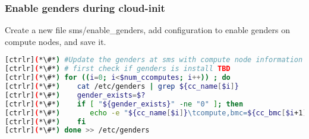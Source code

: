  \subsubsection{Enable genders during cloud-init}
	
	Create a new file sms/enable\_genders, add configuration to enable genders on compute nodes, and save it. 

 
 
 \begin{lstlisting}[language=bash,keywords={}]
[ctrlr](*\#*) #Update the genders at sms with compute node information
[ctrlr](*\#*) # first check if genders is install TBD
[ctrlr](*\#*) for ((i=0; i<$num_ccomputes; i++)) ; do
[ctrlr](*\#*)    cat /etc/genders | grep ${cc_name[$i]}
[ctrlr](*\#*)    gender_exists=$?
[ctrlr](*\#*)    if [ "${gender_exists}" -ne "0" ]; then 
[ctrlr](*\#*)       echo -e "${cc_name[$i]}\tcompute,bmc=${cc_bmc[$i+1]}"
[ctrlr](*\#*)    fi
[ctrlr](*\#*) done >> /etc/genders
 \end{lstlisting}
 
